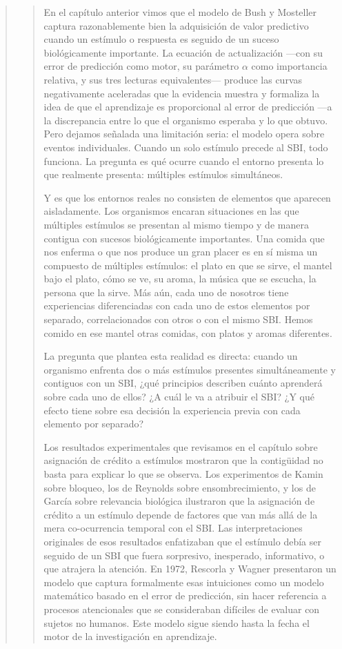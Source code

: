 \documentclass[
  letterpaper,
  DIV=11,
  numbers=noendperiod]{scrreprt}
\begin{document}
\begin{tcolorbox}[enhanced jigsaw, toprule=.15mm, arc=.35mm, colback=white, opacityback=0, colframe=quarto-callout-note-color-frame, breakable, rightrule=.15mm, left=2mm, leftrule=.75mm, bottomrule=.15mm]
\begin{quote}
\begin{quote}
En el capítulo anterior vimos que el modelo de Bush y Mosteller captura
razonablemente bien la adquisición de valor predictivo cuando un
estímulo o respuesta es seguido de un suceso biológicamente importante.
La ecuación de actualización ---con su error de predicción como motor,
su parámetro \(\alpha\) como importancia relativa, y sus tres lecturas
equivalentes--- produce las curvas negativamente aceleradas que la
evidencia muestra y formaliza la idea de que el aprendizaje es
proporcional al error de predicción ---a la discrepancia entre lo que el
organismo esperaba y lo que obtuvo. Pero dejamos señalada una limitación
seria: el modelo opera sobre eventos individuales. Cuando un solo
estímulo precede al SBI, todo funciona. La pregunta es qué ocurre cuando
el entorno presenta lo que realmente presenta: múltiples estímulos
simultáneos.

Y es que los entornos reales no consisten de elementos que aparecen
aisladamente. Los organismos encaran situaciones en las que múltiples
estímulos se presentan al mismo tiempo y de manera contigua con sucesos
biológicamente importantes. Una comida que nos enferma o que nos produce
un gran placer es en sí misma un compuesto de múltiples estímulos: el
plato en que se sirve, el mantel bajo el plato, cómo se ve, su aroma, la
música que se escucha, la persona que la sirve. Más aún, cada uno de
nosotros tiene experiencias diferenciadas con cada uno de estos
elementos por separado, correlacionados con otros o con el mismo SBI.
Hemos comido en ese mantel otras comidas, con platos y aromas
diferentes.

La pregunta que plantea esta realidad es directa: cuando un organismo
enfrenta dos o más estímulos presentes simultáneamente y contiguos con
un SBI, ¿qué principios describen cuánto aprenderá sobre cada uno de
ellos? ¿A cuál le va a atribuir el SBI? ¿Y qué efecto tiene sobre esa
decisión la experiencia previa con cada elemento por separado?

Los resultados experimentales que revisamos en el capítulo sobre
asignación de crédito a estímulos mostraron que la contigüidad no basta
para explicar lo que se observa. Los experimentos de Kamin sobre
bloqueo, los de Reynolds sobre ensombrecimiento, y los de García sobre
relevancia biológica ilustraron que la asignación de crédito a un
estímulo depende de factores que van más allá de la mera co-ocurrencia
temporal con el SBI. Las interpretaciones originales de esos resultados
enfatizaban que el estímulo debía ser seguido de un SBI que fuera
sorpresivo, inesperado, informativo, o que atrajera la atención. En
1972, Rescorla y Wagner presentaron un modelo que captura formalmente
esas intuiciones como un modelo matemático basado en el error de
predicción, sin hacer referencia a procesos atencionales que se
consideraban difíciles de evaluar con sujetos no humanos. Este modelo
sigue siendo hasta la fecha el motor de la investigación en aprendizaje.


\end{quote}
\end{quote}
\end{tcolorbox}
\end{document}
